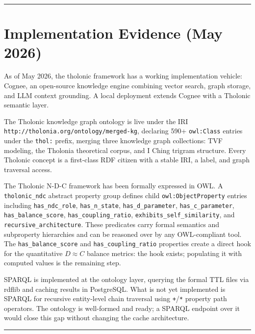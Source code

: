 \documentclass[12pt]{article}
\begin{document}
\begin{center}\rule{0.5\linewidth}{0.5pt}\end{center}

\section{Implementation Evidence (May 2026)}\label{implementation-evidence-may-2026}

As of May 2026, the tholonic framework has a working implementation
vehicle: Cognee, an open-source knowledge engine combining vector
search, graph storage, and LLM context grounding. A local deployment
extends Cognee with a Tholonic semantic layer.

The Tholonic knowledge graph ontology is live under the IRI
\texttt{http://tholonia.org/ontology/merged-kg}, declaring 590+
\texttt{owl:Class} entries under the \texttt{thol:} prefix, merging
three knowledge graph collections: TVF modeling, the Tholonia
theoretical corpus, and I Ching trigram structure. Every Tholonic
concept is a first-class RDF citizen with a stable IRI, a label, and
graph traversal access.

The Tholonic N-D-C framework has been formally expressed in OWL. A
\texttt{tholonic\_ndc} abstract property group defines child
\texttt{owl:ObjectProperty} entries including \texttt{has\_ndc\_role},
\texttt{has\_n\_state}, \texttt{has\_d\_parameter},
\texttt{has\_c\_parameter}, \texttt{has\_balance\_score},
\texttt{has\_coupling\_ratio}, \texttt{exhibits\_self\_similarity}, and
\texttt{recursive\_architecture}. These predicates carry formal
semantics and subproperty hierarchies and can be reasoned over by any
OWL-compliant tool. The \texttt{has\_balance\_score} and
\texttt{has\_coupling\_ratio} properties create a direct hook for the
quantitative \(D \approx C\) balance metrics: the hook exists;
populating it with computed values is the remaining step.

SPARQL is implemented at the ontology layer, querying the formal TTL
files via rdflib and caching results in PostgreSQL. What is not yet
implemented is SPARQL for recursive entity-level chain traversal using
\texttt{+}/\texttt{*} property path operators. The ontology is
well-formed and ready; a SPARQL endpoint over it would close this gap
without changing the cache architecture.

\begin{center}\rule{0.5\linewidth}{0.5pt}\end{center}
\end{document}
